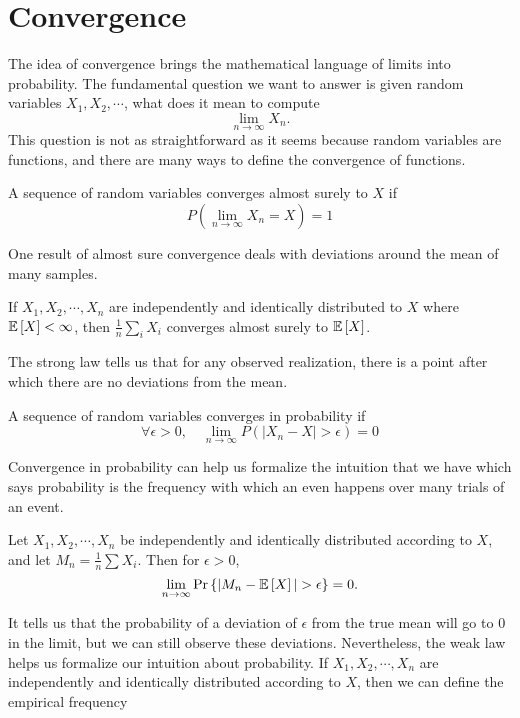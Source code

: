 \section{Convergence}
The idea of convergence brings the mathematical language of limits into probability.
The fundamental question we want to answer is given random variables $X_1, X_2, \cdots$, what does it mean to compute
\[
	\lim_{n\to\infty}X_n.
\]
This question is not as straightforward as it seems because random variables are functions, and there are many ways to define the convergence of functions.
\begin{definition}
	A sequence of random variables converges almost surely to $X$ if \[
		P\left(\lim_{n\to \infty}X_n = X\right) = 1
	\]
	\label{defn:almost-sure}
\end{definition}
One result of almost sure convergence deals with deviations around the mean of many samples.
\begin{theorem}
	If $X_1, X_2, \cdots, X_n$ are independently and identically distributed to $X$ where $\mathbb{E}\left[X\right] < \infty$, then $\frac{1}{n}\sum_i X_i$ converges almost surely to $\mathbb{E}\left[X\right]$.
	\label{thm:strong-law}
\end{theorem}
The strong law tells us that for any observed realization, there is a point after which there are no deviations from the mean.
\begin{definition}
	A sequence of random variables converges in probability if \[
		\forall \epsilon > 0, \quad \lim_{n\to\infty}P(|X_n - X| > \epsilon) = 0
	\]
	\label{defn:converge-prob}
\end{definition}
Convergence in probability can help us formalize the intuition that we have which says probability is the frequency with which an even happens over many trials of an event.
\begin{theorem}
  Let $X_1, X_2, \cdots, X_n$ be independently and identically distributed according to $X$, and let $M_n = \frac{1}{n}\sum X_i$.
  Then for $\epsilon > 0$, \[
	\lim_{n\to\infty} \text{Pr}\left\{|M_n - \mathbb{E}\left[X\right]| > \epsilon\right\} = 0.
  \]
  \label{thm:weak-law}
\end{theorem}
It tells us that the probability of a deviation of $\epsilon$ from the true mean will go to 0 in the limit, but we can still observe these deviations.
Nevertheless, the weak law helps us formalize our intuition about probability.
If $X_1, X_2, \cdots, X_n$ are independently and identically distributed according to $X$, then we can define the empirical frequency
